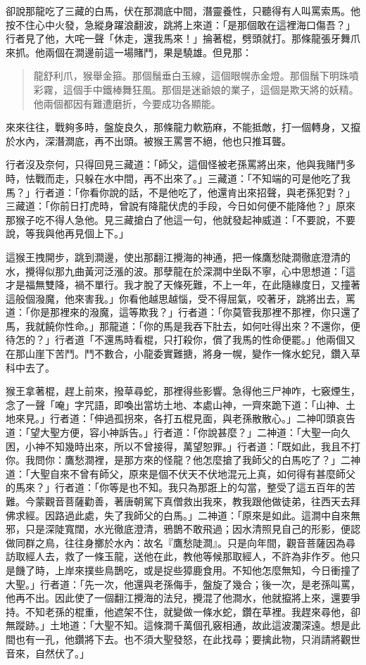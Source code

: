 卻說那龍吃了三藏的白馬，伏在那澗底中間，潛靈養性，只聽得有人叫罵索馬。他按不住心中火發，急縱身躍浪翻波，跳將上來道：「是那個敢在這裡海口傷吾？」行者見了他，大咤一聲「休走，還我馬來！」掄著棍，劈頭就打。那條龍張牙舞爪來抓。他兩個在澗邊前這一場賭鬥，果是驍雄。但見那：
\begin{quote}
龍舒利爪，猴舉金箍。那個鬚垂白玉線，這個眼幌赤金燈。那個鬚下明珠噴彩霧，這個手中鐵棒舞狂風。那個是迷爺娘的業子，這個是欺天將的妖精。他兩個都因有難遭磨折，今要成功各顯能。
\end{quote}

來來往往，戰夠多時，盤旋良久，那條龍力軟筋麻，不能抵敵，打一個轉身，又攛於水內，深潛澗底，再不出頭。被猴王罵詈不絕，他也只推耳聾。

行者沒及奈何，只得回見三藏道：「師父，這個怪被老孫罵將出來，他與我賭鬥多時，怯戰而走，只躲在水中間，再不出來了。」三藏道：「不知端的可是他吃了我馬？」行者道：「你看你說的話，不是他吃了，他還肯出來招聲，與老孫犯對？」三藏道：「你前日打虎時，曾說有降龍伏虎的手段，今日如何便不能降他？」原來那猴子吃不得人急他。見三藏搶白了他這一句，他就發起神威道：「不要說，不要說，等我與他再見個上下。」

這猴王拽開步，跳到澗邊，使出那翻江攪海的神通，把一條鷹愁陡澗徹底澄清的水，攪得似那九曲黃河泛漲的波。那孽龍在於深澗中坐臥不寧，心中思想道：「這才是福無雙降，禍不單行。我才脫了天條死難，不上一年，在此隨緣度日，又撞著這般個潑魔，他來害我。」你看他越思越惱，受不得屈氣，咬著牙，跳將出去，罵道：「你是那裡來的潑魔，這等欺我？」行者道：「你莫管我那裡不那裡，你只還了馬，我就饒你性命。」那龍道：「你的馬是我吞下肚去，如何吐得出來？不還你，便待怎的？」行者道「不還馬時看棍，只打殺你，償了我馬的性命便罷。」他兩個又在那山崖下苦鬥。鬥不數合，小龍委實難搪，將身一幌，變作一條水蛇兒，鑽入草科中去了。

猴王拿著棍，趕上前來，撥草尋蛇，那裡得些影響。急得他三尸神咋，七竅煙生，念了一聲「唵」字咒語，即喚出當坊土地、本處山神，一齊來跪下道：「山神、土地來見。」行者道：「伸過孤拐來，各打五棍見面，與老孫散散心。」二神叩頭哀告道：「望大聖方便，容小神訴告。」行者道：「你說甚麼？」二神道：「大聖一向久困，小神不知幾時出來，所以不曾接得，萬望恕罪。」行者道：「既如此，我且不打你。我問你：鷹愁澗裡，是那方來的怪龍？他怎麼搶了我師父的白馬吃了？」二神道：「大聖自來不曾有師父，原來是個不伏天不伏地混元上真，如何得有甚麼師父的馬來？」行者道：「你等是也不知。我只為那誑上的勾當，整受了這五百年的苦難。今蒙觀音菩薩勸善，著唐朝駕下真僧救出我來，教我跟他做徒弟，往西天去拜佛求經。因路過此處，失了我師父的白馬。」二神道：「原來是如此。這澗中自來無邪，只是深陡寬闊，水光徹底澄清，鴉鵲不敢飛過；因水清照見自己的形影，便認做同群之鳥，往往身擲於水內：故名『鷹愁陡澗』。只是向年間，觀音菩薩因為尋訪取經人去，救了一條玉龍，送他在此，教他等候那取經人，不許為非作歹。他只是饑了時，上岸來撲些鳥鵲吃，或是捉些獐鹿食用。不知他怎麼無知，今日衝撞了大聖。」行者道：「先一次，他還與老孫侮手，盤旋了幾合；後一次，是老孫叫罵，他再不出。因此使了一個翻江攪海的法兒，攪混了他澗水，他就攛將上來，還要爭持。不知老孫的棍重，他遮架不住，就變做一條水蛇，鑽在草裡。我趕來尋他，卻無蹤跡。」土地道：「大聖不知。這條澗千萬個孔竅相通，故此這波瀾深遠。想是此間也有一孔，他鑽將下去。也不須大聖發怒，在此找尋；要擒此物，只消請將觀世音來，自然伏了。」

